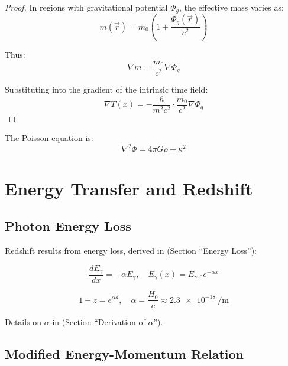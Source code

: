 \documentclass[a4paper,12pt]{article}
\theoremstyle{definition}
\theoremstyle{remark}
\newcommand{\Tfield}{T(x)}
\begin{document}
	\begin{proof}
		In regions with gravitational potential \(\Phi_g\), the effective mass varies as:
		\begin{equation}
			m(\vec{r}) = m_0 \left(1 + \frac{\Phi_g(\vec{r})}{c^2}\right)
		\end{equation}
		
		Thus:
		\begin{equation}
			\nabla m = \frac{m_0}{c^2} \nabla \Phi_g
		\end{equation}
		
		Substituting into the gradient of the intrinsic time field:
		\begin{equation}
			\nabla \Tfield = -\frac{\hbar}{m^2 c^2} \cdot \frac{m_0}{c^2} \nabla \Phi_g
		\end{equation}
	\end{proof}
	
	The Poisson equation is:
	\begin{equation}
		\nabla^2 \Phi = 4\pi G \rho + \kappa^2
	\end{equation}
	
	\section{Energy Transfer and Redshift}
	
	\subsection{Photon Energy Loss}
	
	Redshift results from energy loss, derived in \cite{pascher_messdifferenzen_2025} (Section “Energy Loss”):
	
	\begin{equation}
		\frac{d E_{\gamma}}{d x} = -\alpha E_{\gamma}, \quad E_{\gamma}(x) = E_{\gamma,0} e^{-\alpha x}
	\end{equation}
	
	\begin{equation}
		1 + z = e^{\alpha d}, \quad \alpha = \frac{H_0}{c} \approx \SI{2.3e-18}{\per\meter}
	\end{equation}
	
	Details on \(\alpha\) in \cite{pascher_params_2025} (Section “Derivation of \(\alpha\)”).
	
	\subsection{Modified Energy-Momentum Relation}
	
\end{document}

